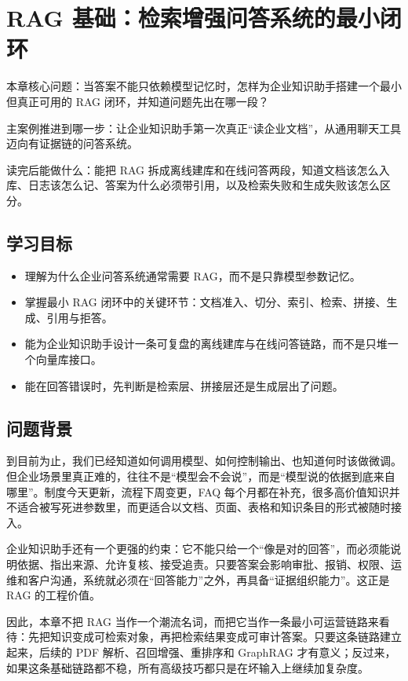 \chapter{RAG 基础：检索增强问答系统的最小闭环}

\begin{introduction}
\item {\heiti 本章核心问题}：当答案不能只依赖模型记忆时，怎样为企业知识助手搭建一个最小但真正可用的 RAG 闭环，并知道问题先出在哪一段？
\item {\heiti 主案例推进到哪一步}：让企业知识助手第一次真正“读企业文档”，从通用聊天工具迈向有证据链的问答系统。
\item {\heiti 读完后能做什么}：能把 RAG 拆成离线建库和在线问答两段，知道文档该怎么入库、日志该怎么记、答案为什么必须带引用，以及检索失败和生成失败该怎么区分。
\end{introduction}

\section{学习目标}
\begin{itemize}
  \item 理解为什么企业问答系统通常需要 RAG，而不是只靠模型参数记忆。
  \item 掌握最小 RAG 闭环中的关键环节：文档准入、切分、索引、检索、拼接、生成、引用与拒答。
  \item 能为企业知识助手设计一条可复盘的离线建库与在线问答链路，而不是只堆一个向量库接口。
  \item 能在回答错误时，先判断是检索层、拼接层还是生成层出了问题。
\end{itemize}

\section{问题背景}
到目前为止，我们已经知道如何调用模型、如何控制输出、也知道何时该做微调。但企业场景里真正难的，往往不是“模型会不会说”，而是“模型说的依据到底来自哪里”。制度今天更新，流程下周变更，FAQ 每个月都在补充，很多高价值知识并不适合被写死进参数里，而更适合以文档、页面、表格和知识条目的形式被随时接入。

企业知识助手还有一个更强的约束：它不能只给一个“像是对的回答”，而必须能说明依据、指出来源、允许复核、接受追责。只要答案会影响审批、报销、权限、运维和客户沟通，系统就必须在“回答能力”之外，再具备“证据组织能力”。这正是 RAG 的工程价值。

因此，本章不把 RAG 当作一个潮流名词，而把它当作一条最小可运营链路来看待：先把知识变成可检索对象，再把检索结果变成可审计答案。只要这条链路建立起来，后续的 PDF 解析、召回增强、重排序和 GraphRAG 才有意义；反过来，如果这条基础链路都不稳，所有高级技巧都只是在坏输入上继续加复杂度。

